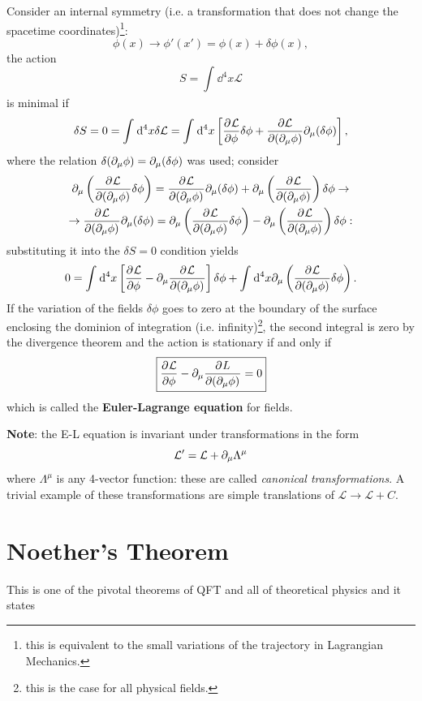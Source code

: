 Consider an internal symmetry (i.e. a transformation that does not change the
spacetime coordinates)\footnote{this is equivalent to the small variations of the
trajectory in Lagrangian Mechanics.}:
$$\phi(x)\rightarrow \phi'(x')=\phi(x)+\delta\phi(x),$$
the action
$$S=\int_{}^{}\dd^4x\mathcal{L}$$
is minimal if
$$\delta S =0 = \int_{}^{}\dd^4x\delta\mathcal{L} = 
\int_{}^{}\dd^4x \left[\pdv[]{\mathcal{L}}{\phi}\delta\phi + \pdv{\mathcal{L}}
{(\partial_\mu\phi)}\partial_\mu(\delta\phi)\right],
$$
where the relation $\delta(\partial_\mu\phi) = \partial_\mu(\delta\phi)$ was used;
consider
\begin{gather*}
\partial_\mu\left(\pdv[]{\mathcal{L}}{(\partial_\mu\phi)}\delta\phi\right) = 
\pdv[]{\mathcal{L}}{(\partial_\mu\phi)}\partial_\mu(\delta\phi)+\partial_\mu\left(
\pdv[]{\mathcal{L}}{(\partial_\mu\phi)}\right)\delta\phi \rightarrow\\
\rightarrow\pdv[]{\mathcal{L}}{(\partial_\mu\phi)}\partial_\mu(\delta\phi) = \partial_\mu\left(
\pdv[]{\mathcal{L}}{(\partial_\mu\phi)}\delta\phi
\right) - \partial_\mu\left(\pdv[]{\mathcal{L}}{(\partial_\mu\phi)}\right)\delta\phi:
\end{gather*}
substituting it into the $\delta S=0$ condition yields
$$0=\int_{}^{}\dd^4x\left[\pdv[]{\mathcal{L}}{\phi}-\partial_\mu\pdv[]{\mathcal{L}}
{(\partial_\mu\phi)}\right]\delta\phi + \int_{}^{}\dd^4x\partial_\mu\left(\pdv[]{\mathcal{L}}
{(\partial_\mu\phi)}\delta \phi\right).$$
If the variation of the fields $\delta\phi$ goes to zero at the boundary of the
surface enclosing the dominion of integration (i.e. infinity)\footnote{
this is the case for all physical fields.}, the second integral
is zero by the divergence theorem and the action is stationary if and only if
$$\boxed{\pdv[]{\mathcal{L}}{\phi}-\partial_\mu\pdv[]{L}{(\partial_\mu\phi)}=0}$$
which is called the \textbf{Euler-Lagrange equation} for fields.

\textbf{Note}: the E-L equation is invariant under transformations in the form
$$\mathcal{L}'=\mathcal{L}+\partial_\mu\Lambda^\mu$$
where $\Lambda^\mu$ is any 4-vector function: these are called \textit{canonical
transformations}. A trivial example of these transformations are simple translations
of $\mathcal{L}\rightarrow\mathcal{L}+C$.

\section{Noether's Theorem}
This is one of the pivotal theorems of QFT and all of theoretical physics and it
states

\noindent{}

